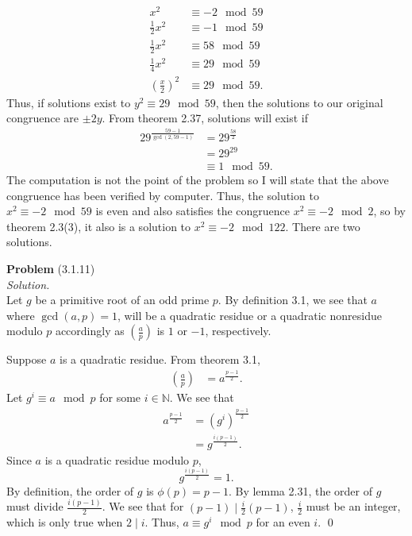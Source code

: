 \documentclass[12 pt]{amsart}
\begin{document}
\begin{enumerate}
\begin{align*}
        x^2 &\equiv -2 \mod 59 \\
        \frac{1}{2} x^2 &\equiv -1 \mod 59 \\
        \frac{1}{2} x^2 &\equiv 58 \mod 59 \\
        \frac{1}{4} x^2 &\equiv 29 \mod 59 \\
        \left( \frac{x}{2} \right)^2 &\equiv 29 \mod 59.
      \end{align*}
      Thus, if solutions exist to $y^2 \equiv 29 \mod 59$, then
      the solutions to our original congruence are $\pm 2y$. 
      From theorem 2.37, solutions will exist if
      \begin{align*}
        29^{\frac{59 - 1}{\gcd(2, 59 - 1)}} &= 29^{\frac{58}{2}} \\
                                      &= 29^{29} \\
                                      &\equiv 1 \mod 59.
      \end{align*}
      The computation is not the point of the problem so I will
      state that the above congruence has been verified 
      by computer. 
      Thus, the solution to $x^2 \equiv -2 \mod 59$ is even
      and also satisfies the congruence $x^2 \equiv -2 \mod 2$, 
      so by theorem 2.3(3), it also is a solution to
      $x^2 \equiv -2 \mod 122$. 
      There are two solutions. 
      
      
 
	\end{enumerate}
\vfill
\newpage



\phantom{\quad} \vfill
\noindent
\textbf{Problem} (3.1.11) \\[4ex]
\emph{Solution.} \\[2ex]
  Let $g$ be a primitive root of an odd prime $p$.
  By definition 3.1, we see that $a$ where $\gcd(a, p) = 1$,  
  will be a quadratic residue
  or a quadratic nonresidue modulo $p$ accordingly as 
  $  \left( \frac{a}{p} \right) $
  is $1$ or $-1$, respectively.

  Suppose $a$ is a quadratic residue.
  From theorem 3.1,
  \begin{align*}
    \left( \frac{a}{p} \right) &= a^{\frac{p-1}{2}}.
  \end{align*}
  Let $g^i \equiv a \mod p$ for some $i \in \mathbb{N}$.
  We see that 
  \begin{align*}
    a^{\frac{p-1}{2}}  &= \left( g^{i} \right)^{\frac{p-1}{2}} \\
                       &=  g^{\frac{i(p-1)}{2}}.
  \end{align*}
  Since $a$ is a quadratic residue modulo $p$, 
  \[
    g^{\frac{i(p-1)}{2}} = 1.
  \]
  By definition, the order of $g$ is $\phi(p) = p-1$.
  By lemma 2.31, the order of $g$ must divide $\frac{i(p-1)}{2}$.
  We see that for $(p-1) \mid \frac{i}{2} (p-1)$, 
  $\frac{i}{2}$ must be an integer, which is only true when 
  $2 \mid i$. 
  Thus, $a \equiv g^i \mod p$ for an even $i$.
  \qed
\end{document}
